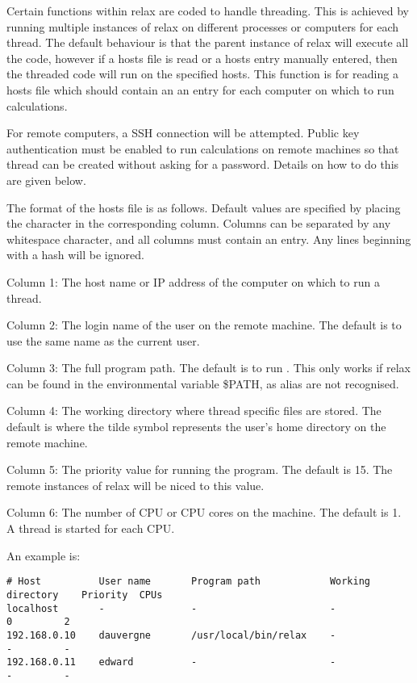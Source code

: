 Certain functions within relax are coded to handle threading.  This is achieved by running
multiple instances of relax on different processes or computers for each thread.  The
default behaviour is that the parent instance of relax will execute all the code, however if
a hosts file is read  or a hosts entry manually entered, then the threaded code will run on
the specified hosts.  This function is for reading  a hosts file which should contain an
an entry for each computer on which to run calculations.

For remote computers, a SSH connection will be attempted.  Public key authentication must be
enabled to run calculations on remote machines so that thread can be created without asking
for a password.  Details on how to do this are given below.


The format of the hosts file is as follows.  Default values are specified by placing the
character 
 in the corresponding column.  Columns can be separated by any whitespace
character, and all columns must contain an entry.  Any lines beginning with a hash will be
ignored.

Column 1:  The host name or IP address of the computer on which to run a thread.

Column 2:  The login name of the user on the remote machine.  The default is to use the same
name as the current user.

Column 3:  The full program path.  The default is to run 
.  This only works if relax
can be found in the environmental variable \$PATH, as alias are not recognised.

Column 4:  The working directory where thread specific files are stored.  The default is
 where the tilde 
 symbol represents the user's home directory on the remote
machine.

Column 5:  The priority value for running the program.  The default is 15.  The remote
instances of relax will be niced to this value.

Column 6:  The number of CPU or CPU cores on the machine.  The default is 1.  A thread is
started for each CPU.

An example is:

{\footnotesize \begin{verbatim}
# Host          User name       Program path            Working directory    Priority  CPUs
localhost       -               -                       -                    0         2
192.168.0.10    dauvergne       /usr/local/bin/relax    -                    -         -
192.168.0.11    edward          -                       -                    -         -
\end{verbatim}}

